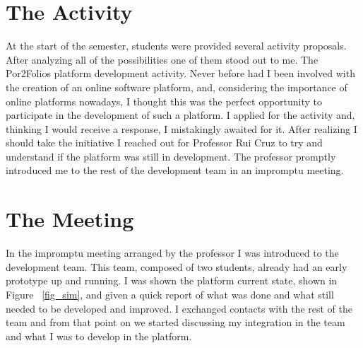 \documentclass[a4paper,12pt,journal,twoside,compsoc]{PPIEEEtran}
\begin{document}
\section{The Activity}
At the start of the semester, students were provided several activity proposals. After analyzing all of the possibilities one of them stood out to me. The Por2Folios platform development activity. Never before had I been involved with the creation of an online software platform, and, considering the importance of online platforms nowadays, I thought this was the perfect opportunity to participate in the development of such a platform. I applied for the activity and, thinking I would receive a response, I mistakingly awaited for it. After realizing I should take the initiative I reached out for Professor Rui Cruz to try and understand if the platform was still in development. The professor promptly introduced me to the rest of the development team in an impromptu meeting. 


\section{The Meeting}
In the  impromptu meeting arranged by the professor I was introduced to the development team. This team, composed of two students, already had an early prototype up and running. I was shown the platform current state, shown in Figure ~\ref{fig_sim}, and given a quick report of what was done and what still needed to be developed and improved. I exchanged contacts with the rest of the team and from that point on we started discussing my integration in the team and what I was to develop in the platform.
\end{document}

